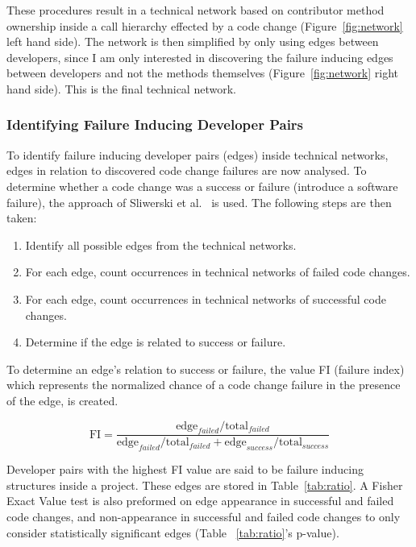 These procedures result in a technical network based on contributor method ownership 
inside a call hierarchy effected by a code change (Figure~\ref{fig:network} left hand side).
The network is then simplified by only using edges between developers, since I
am only interested in discovering the failure inducing edges between developers and not the 
methods themselves (Figure~\ref{fig:network} right hand side). This is the final technical 
network.

\subsubsection{Identifying Failure Inducing Developer Pairs}
To identify failure inducing developer pairs (edges) inside technical networks, 
edges in relation to discovered code change failures are now analysed. To determine whether a code change 
was a success or failure (introduce a software failure), the approach of
Sliwerski et al.~\cite{Sliwerski:2005:CIF} is used. The following steps are then taken:

\begin{enumerate}
\item Identify all possible edges from the technical networks.
\item For each edge, count occurrences in technical networks of failed code changes.
\item For each edge, count occurrences in technical networks of successful code changes.
\item Determine if the edge is related to success or failure.
\end{enumerate}

To determine an edge's relation to success or failure,  the value FI (failure
index) which represents the normalized chance of a code change failure in the presence
of the edge, is created. 

\begin{equation}
\text{FI} = \frac{ \text{edge}_{failed} / \text{total}_{failed}}{\text{edge}_{failed} / \text{total}_{failed} + \text{edge}_{success} / \text{total}_{success}}
\end{equation}

Developer pairs with the highest FI value are said to be failure inducing structures
inside a project. These edges are stored in Table~\ref{tab:ratio}. A Fisher Exact Value test 
is also preformed on edge appearance in successful and failed
code changes, and non-appearance in successful and failed code changes to only
consider statistically significant edges (Table ~\ref{tab:ratio}'s p-value). 


